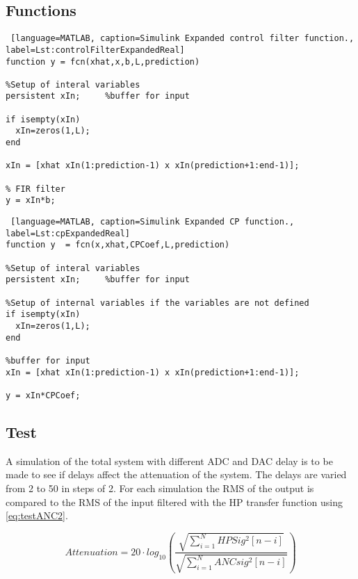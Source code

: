 \subsection{Functions}

\begin{lstlisting} [language=MATLAB, caption=Simulink Expanded control filter function., label=Lst:controlFilterExpandedReal]
function y = fcn(xhat,x,b,L,prediction)

%Setup of interal variables
persistent xIn;     %buffer for input

if isempty(xIn)
  xIn=zeros(1,L);
end

xIn = [xhat xIn(1:prediction-1) x xIn(prediction+1:end-1)];

% FIR filter
y = xIn*b;
\end{lstlisting}

\begin{lstlisting} [language=MATLAB, caption=Simulink Expanded CP function., label=Lst:cpExpandedReal]
function y  = fcn(x,xhat,CPCoef,L,prediction)

%Setup of interal variables
persistent xIn;     %buffer for input

%Setup of internal variables if the variables are not defined
if isempty(xIn)
  xIn=zeros(1,L);
end

%buffer for input
xIn = [xhat xIn(1:prediction-1) x xIn(prediction+1:end-1)];

y = xIn*CPCoef;
\end{lstlisting}

\subsection{Test}
A simulation of the total system with different ADC and DAC delay is to be made to see if delays affect the attenuation of the system. The delays are varied from 2 to 50 in steps of 2. For each simulation the RMS of the output is compared to the RMS of the input filtered with the HP transfer function using \autoref{eq:testANC2}. 

\begin{equation}\label{eq:testANC2}
	Attenuation=20 \cdot log_{10} \left (\frac{\sqrt{\sum\limits_{i=1}^{N}HPSig^2[n-i]}}{\sqrt{\sum\limits_{i=1}^{N}ANCsig^2[n-i]}}  \right )
\end{equation}

